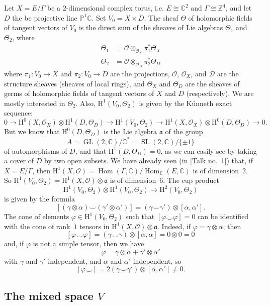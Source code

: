 \documentclass{article}
\newcommand{\scr}[1]{{\mathscr{#1}}}
\newcommand{\fk}[1]{{\mathfrak{#1}}}
\newcommand{\ZZ}{\mathbb{Z}}
\newcommand{\CC}{\mathbb{C}}
\newcommand{\PP}{\mathbb{P}}
\newcommand{\HH}{\mathrm{H}}
\DeclareMathOperator{\Hom}{Hom}
\DeclareMathOperator{\GL}{GL}
\DeclareMathOperator{\SL}{SL}
\newcommand{\oldpage}[1]{\marginpar{\footnotesize$\Big\vert$ \textit{p.~#1}}}
\begin{document}
Let $X=E/\Gamma$ be a $2$-dimensional complex torus, i.e. $E\cong\CC^2$ and $\Gamma\cong\ZZ^4$, and let $D$ the be projective line $\PP^1\CC$.
Set $V_0=X\times D$.
The sheaf $\Theta$ of holomorphic fields of tangent vectors of $V_0$ is the direct sum of the sheaves of Lie algebras $\Theta_1$ and $\Theta_2$, where
\[
  \begin{aligned}
    \Theta_1 &= \scr{O}\otimes_{\scr{O}_X}\pi_1^*\Theta_X
  \\\Theta_2 &= \scr{O}\otimes_{\scr{O}_D}\pi_2^*\Theta_D
  \end{aligned}
\]
where $\pi_1\colon V_0\to X$ and $\pi_2\colon V_0\to D$ are the projections, $\scr{O}$, $\scr{O}_X$, and $\scr{D}$ are the structure sheaves (sheaves of local rings), and $\Theta_X$ and $\Theta_D$ are the sheaves of germs of holomorphic fields of tangent vectors of $X$ and $D$ (respectively).
We are mostly interested in $\Theta_2$.
Also, $\HH^1(V_0,\Theta_2)$ is given by the K\"{u}nneth exact sequence:
\oldpage{4-06}
\[
  0 \to
  \HH^0(X,\scr{O}_X)\otimes\HH^1(D,\Theta_D) \to
  \HH^1(V_0,\Theta_2) \to
  \HH^1(X,\scr{O}_X)\otimes\HH^0(D,\Theta_D) \to
  0.
\]
But we know that $\HH^0(D,\Theta_D)$ is the Lie algebra $\fk{a}$ of the group
\[
  A = \GL(2,\CC)/\CC^* = \SL(2,\CC)/\{\pm1\}
\]
of automorphisms of $D$, and that $\HH^1(D,\Theta_D)=0$, as we can easily see by taking a cover of $D$ by two open subsets.
We have already seen (in [Talk no.~1]) that, if $X=E/\Gamma$, then $\HH^1(X,\scr{O})=\Hom(\Gamma,\CC)/\Hom_{\CC}(E,\CC)$ is of dimension~$2$.
So $\HH^1(V_0,\Theta_2)=\HH^1(X,\scr{O})\otimes\fk{a}$ is of dimension~$6$.
The cup product
\[
  \HH^1(V_0,\Theta_2)\otimes\HH^1(V_0,\Theta_2) \to \HH^2(V_0,\Theta_2)
\]
is given by the formula
\[
  [(\gamma\otimes\alpha)\smile(\gamma'\otimes\alpha')]
  = (\gamma\smile\gamma')\otimes[\alpha,\alpha'].
\]
The cone of elements $\varphi\in\HH^1(V_0,\Theta_2)$ such that $[\varphi\smile\varphi]=0$ can be identified with the cone of rank~$1$ tensors in $\HH^1(X,\scr{O})\otimes\fk{a}$.
Indeed, if $\varphi=\gamma\otimes\alpha$, then
\[
  [\varphi\smile\varphi]
  = (\gamma\smile\gamma)\otimes[\alpha,\alpha]
  = 0\otimes0
  = 0
\]
and, if $\varphi$ is not a simple tensor, then we have
\[
  \varphi = \gamma\otimes\alpha + \gamma'\otimes\alpha'
\]
with $\gamma$ and $\gamma'$ independent, and $\alpha$ and $\alpha'$ independent, so
\[
  [\varphi\smile] = 2(\gamma\smile\gamma')\otimes[\alpha,\alpha'] \neq 0.
\]


\subsection{The mixed space \texorpdfstring{$V$}{V}}
\label{III.2}
\end{document}
